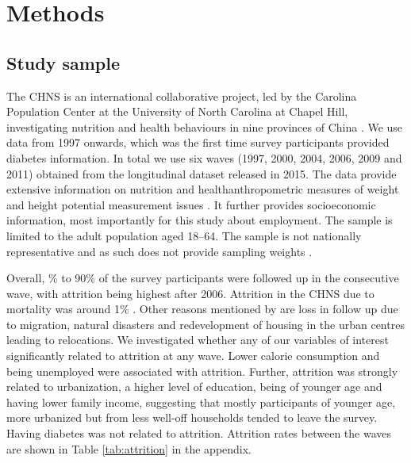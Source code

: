 \section{\label{sec:Methods5}Methods}

\subsection{Study sample}


The \acf{CHNS} is an international collaborative project, led by the Carolina Population Center at the University of North Carolina at Chapel Hill, investigating nutrition and health behaviours in nine provinces of China \parencite{Zhang2014d}. We use data from 1997 onwards, which was the first time survey participants provided diabetes information. In total we use six waves (1997, 2000, 2004, 2006, 2009 and 2011) obtained from the longitudinal dataset released in 2015. The data provide extensive information on nutrition and health\DIFdelbegin {}\DIFdelend \DIFaddbegin {}\DIFaddend anthropometric measures of weight and height \DIFdelbegin {}\DIFdelend \DIFaddbegin {}\DIFaddend potential measurement issues \DIFaddbegin {}\DIFaddend . It further provides socioeconomic information, most importantly for this study about employment. The sample is limited to the adult population aged 18--64.  The sample is not nationally representative and as such does not provide sampling weights  \parencite{Popkin2010}.

Overall, \DIFdelbegin {}\% to 90\% of the survey participants were followed up in the consecutive wave, with attrition being highest after 2006. Attrition in the \ac{CHNS} due to mortality was around 1\% \parencite{Popkin2010}. Other reasons mentioned by \textcite{Popkin2010} are loss in follow up due to migration, natural disasters and redevelopment of housing in the urban centres leading to relocations. We investigated whether any of our variables of interest \DIFdelbegin {}\DIFdelend \DIFaddbegin {}\DIFaddend significantly related to attrition at any wave. Lower calorie consumption and being unemployed were associated with attrition. Further, attrition was strongly related to urbanization, a higher level of education, being of younger age and having lower family income, suggesting that mostly participants of younger age, more urbanized but from less well-off households tended to leave the survey. Having diabetes was not related to attrition. Attrition rates between the waves are shown in Table \ref{tab:attrition} in the appendix.


